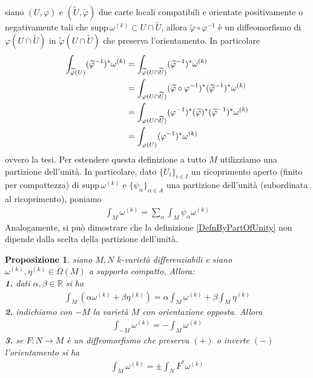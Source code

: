 \documentclass[oneside, 11pt]{amsbook}
\makeatletter
\newcommand{\0}{{(0)}}
\newcommand{\3}{{(3)}}
\theoremstyle{colonplain}
\newtheorem{prop}[thm]{Proposizione}
\theoremstyle{colondefinition}
\theoremstyle{colonremark}
\numberwithin{equation}{chapter}
\renewcommand{\proofname}{Dimostrazione}
\renewenvironment{proof}[1][\proofname]{\par
  \pushQED{\qed}%
  \normalfont \topsep6\p@\@plus6\p@\relax
  \trivlist
  \item[\hskip\labelsep\bfseries #1:]\ignorespaces
}{%
  \popQED\endtrivlist\@endpefalse
}
\makeatother
\begin{document}
\begin{proof} siano $(U, \varphi)$ e $(\widetilde{U}, \widetilde{\varphi})$ due carte locali compatibili e orientate positivamente o negativamente tali che $\mathrm{supp} \, \omega^{(k)} \subset U \cap \widetilde{U}$, allora $\widetilde{\varphi} \circ \varphi^{-1}$ è un diffeomorfismo di $\varphi(U \cap \widetilde{U})$ in $\widetilde\varphi(U \cap \widetilde{U})$ che preserva l'orientamento. In particolare
\begin{align}
    \int_{\widetilde{\varphi}(U)} (\widetilde{\varphi}^{-1})^*\omega^{(k)} &= \int_{\widetilde{\varphi}(U \cap \widetilde{U})} (\widetilde{\varphi}^{-1})^*\omega^{(k)} \notag \\
    &= \int_{\varphi(U \cap \widetilde{U})} (\widetilde{\varphi} \circ \varphi^{-1})^*(\widetilde{\varphi}^{-1})^*\omega^{(k)} \notag \\
    &= \int_{\varphi(U \cap \widetilde{U})} (\varphi^{-1})^*(\widetilde{\varphi})^*(\widetilde{\varphi}^{-1})^*\omega^{(k)} \notag \\
    &= \int_{\varphi(U)}(\varphi^{-1})^*\omega^{(k)}
\end{align}
ovvero la tesi.
\end{proof}
Per estendere questa definizione a tutto $M$ utilizziamo una partizione dell'unità. In particolare, dato $\{U_i\}_{i \in I}$ un ricoprimento aperto (finito per compattezza) di $\mathrm{supp} \, \omega^{(k)}$ e $\{\psi_\alpha\}_{\alpha \in A}$ una partizione dell'unità (subordinata al ricoprimento), poniamo
\begin{align}\label{DefnByPartOfUnity}
    \int_M \omega^{(k)} = \sum_\alpha \int_M \psi_\alpha \omega^{(k)}
\end{align}
Analogamente, si può dimostrare che la definizione \eqref{DefnByPartOfUnity} non dipende dalla scelta della partizione dell'unità.
\begin{prop} siano $M, N$ $k$-varietà differenziabili e siano $\omega^{(k)}, \eta^{(k)} \in \Omega(M)$ a supporto compatto. Allora: \\
\textbf{1.} dati $\alpha, \beta \in \mathbb{R}$ si ha
\begin{align}
    \int_M (\alpha\omega^{(k)} + \beta\eta^{(k)}) = \alpha\int_M \omega^{(k)} + \beta\int_M \eta^{(k)}
\end{align}
\textbf{2.} indichiamo con $-M$ la varietà $M$ con orientazione opposta. Allora
\begin{align}
    \int_{-M} \omega^{(k)} = -\int_M \omega^{(k)}
\end{align}
\textbf{3.} se $F : N \longrightarrow M$ è un diffeomorfismo che preserva $(+)$ o inverte $(-)$ l'orientamento si ha
\begin{align}
    \int_M \omega^{(k)} = \pm\int_{N} F^*\omega^{(k)}
\end{align}
\end{prop}
\end{document}
